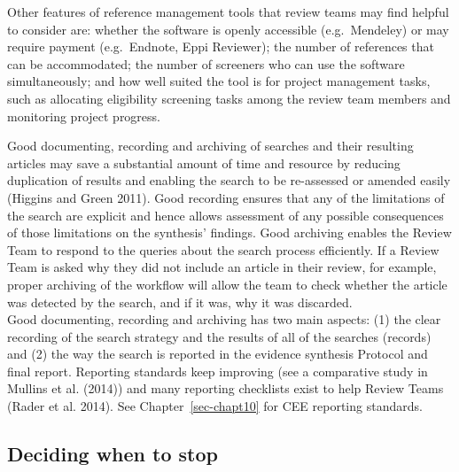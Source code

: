 \documentclass[
  letterpaper,
  DIV=11,
  numbers=noendperiod]{scrreprt}
\begin{document}
Other features of reference management tools that review teams may find
helpful to consider are: whether the software is openly accessible
(e.g.~Mendeley) or may require payment (e.g.~Endnote, Eppi Reviewer);
the number of references that can be accommodated; the number of
screeners who can use the software simultaneously; and how well suited
the tool is for project management tasks, such as allocating eligibility
screening tasks among the review team members and monitoring project
progress.

Good documenting, recording and archiving of searches and their
resulting articles may save a substantial amount of time and resource by
reducing duplication of results and enabling the search to be
re-assessed or amended easily (Higgins and Green 2011). Good recording
ensures that any of the limitations of the search are explicit and hence
allows assessment of any possible consequences of those limitations on
the synthesis' findings. Good archiving enables the Review Team to
respond to the queries about the search process efficiently. If a Review
Team is asked why they did not include an article in their review, for
example, proper archiving of the workflow will allow the team to check
whether the article was detected by the search, and if it was, why it
was discarded.\\
Good documenting, recording and archiving has two main aspects: (1) the
clear recording of the search strategy and the results of all of the
searches (records) and (2) the way the search is reported in the
evidence synthesis Protocol and final report. Reporting standards keep
improving (see a comparative study in Mullins et al. (2014)) and many
reporting checklists exist to help Review Teams (Rader et al. 2014). See
Chapter~\ref{sec-chapt10} for CEE reporting standards.

\subsection{Deciding when to stop}\label{sec-stop}
\end{document}

